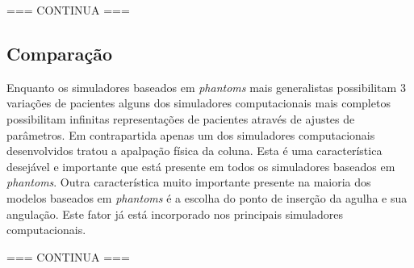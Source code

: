 === CONTINUA ===

\subsection {Comparação}

Enquanto os simuladores baseados em \textit{phantoms} mais generalistas possibilitam 3 variações de pacientes alguns dos simuladores computacionais mais completos possibilitam infinitas representações de pacientes através de ajustes de parâmetros. Em contrapartida apenas um dos simuladores computacionais desenvolvidos tratou a apalpação física da coluna. Esta é uma característica desejável e importante que está presente em todos os simuladores baseados em \textit{phantoms}. Outra característica muito importante presente na maioria dos modelos baseados em \textit{phantoms} é a escolha do ponto de inserção da agulha e sua angulação. Este fator já está incorporado nos principais simuladores computacionais.

=== CONTINUA ===